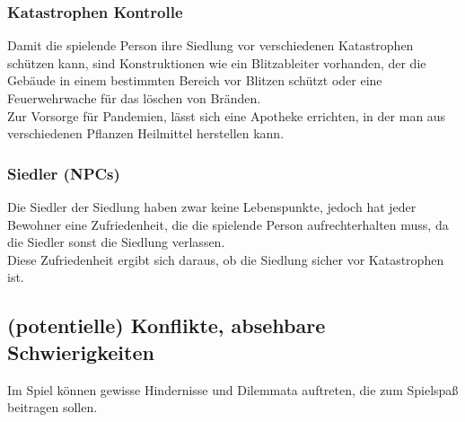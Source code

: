 \documentclass[paper=A4,pagesize=auto,12pt,headinclude=true,footinclude=true,BCOR=0mm,DIV=calc]{scrartcl}
\newcommand{\sectionspace}{
	\vspace{0.5cm}
}
\begin{document}
\subsubsection{Katastrophen Kontrolle}
Damit die spielende Person ihre Siedlung vor verschiedenen Katastrophen schützen kann, sind Konstruktionen wie ein Blitzableiter vorhanden, der die Gebäude in einem bestimmten Bereich vor Blitzen schützt oder eine Feuerwehrwache für das löschen von Bränden.\\
Zur Vorsorge für Pandemien, lässt sich eine Apotheke errichten, in der man aus verschiedenen Pflanzen Heilmittel herstellen kann. 

\subsubsection{Siedler (NPCs)}
Die Siedler der Siedlung haben zwar keine Lebenspunkte, jedoch hat jeder Bewohner eine Zufriedenheit, die die spielende Person aufrechterhalten muss, da die Siedler sonst die Siedlung verlassen.\\
Diese Zufriedenheit ergibt sich daraus, ob die Siedlung sicher vor Katastrophen ist.

\sectionspace
\subsection{(potentielle) Konflikte, absehbare Schwierigkeiten}\label{sec:Konflikte}

Im Spiel können gewisse Hindernisse und Dilemmata auftreten, die zum Spielspaß beitragen sollen.\\
\end{document}

